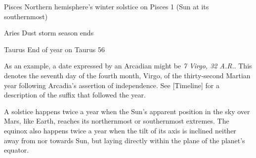 {    \bTR
      \bTC Pisces \eTC
      \bTC \math{[270^{\circ},300^{\circ})} \eTC
       \eTC
       \eTC
      \bTC Northern hemisphere's winter solstice on Pisces 1 (Sun at its southernmost) \eTC
    \eTR
    
    \bTR
      \bTC Aries \eTC
      \bTC \math{[300^{\circ},330^{\circ})} \eTC
       \eTC
       \eTC
      \bTC Dust storm season ends \eTC
    \eTR 

    \bTR
      \bTC Taurus \eTC
      \bTC \math{[330^{\circ},360^{\circ})} \eTC
       \eTC
       \eTC
      \bTC End of year on Taurus 56 \eTC
    \eTR 
\eTABLEbody

\eTABLE
}

As an example, a date expressed by an Arcadian might be {\it 7 Virgo, 32 A.R.}. This denotes the seventh day of the fourth month, Virgo, of the thirty-second Martian year following Arcadia's assertion of independence. See [Timeline] for a description of the suffix that followed the year.


A solstice happens twice a year when the Sun's apparent position in the sky over Mars, like Earth, reaches its northernmost or southernmost extremes. The equinox also happens twice a year when the tilt of its axis is inclined neither away from nor towards Sun, but laying directly within the plane of the planet's equator.

